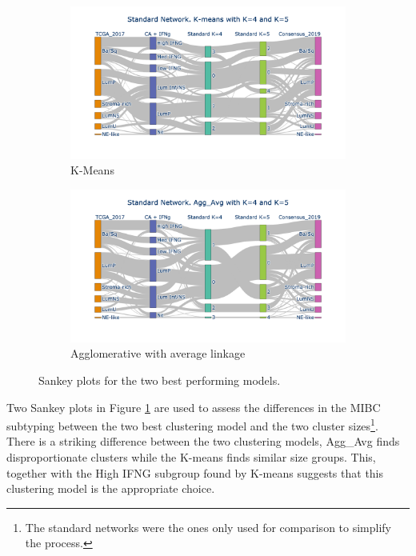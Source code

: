 \begin{figure}[!htb]
    \hfill
    \begin{subfigure}[b]{0.49\textwidth}
        \centering
        \includegraphics[width=\textwidth,keepaspectratio]{Sections/Network_I/Resources/P0/Sankey_KM_4K_v3.png}
        \caption{K-Means}
    \end{subfigure}
    \hfill
    \begin{subfigure}[b]{0.49\textwidth}
        \centering
        \includegraphics[width=\textwidth,keepaspectratio]{Sections/Network_I/Resources/P0/Sankey_Avg_4K_v3.png}
        \caption{Agglomerative with average linkage}
    \end{subfigure}
    \hfill
    \caption{Sankey plots for the two best performing models. }
    \label{fig:N_I:p0_sky_Agg_KMeans}
\end{figure}


Two Sankey plots in Figure \ref{fig:N_I:p0_sky_Agg_KMeans} are used to assess the differences in the MIBC subtyping between the two best clustering model and the two cluster sizes\footnote{The standard networks were the ones only used for comparison to simplify the process.}. There is a striking difference between the two clustering models, Agg\_Avg finds disproportionate clusters while the K-means finds similar size groups. This, together with the High IFNG subgroup found by K-means suggests that this clustering model is the appropriate choice. 

